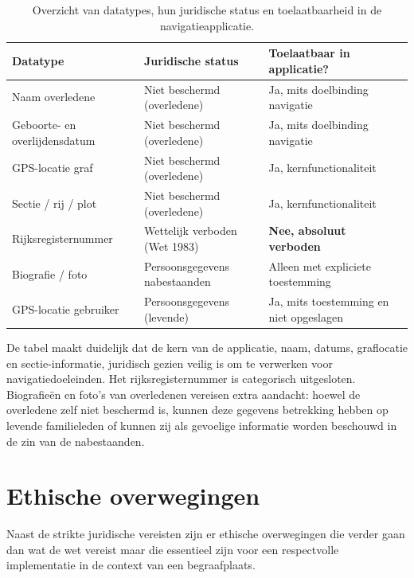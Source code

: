 \begin{table}[h]
    \centering
    \caption[Datatypes en juridische toelaatbaarheid]{Overzicht van datatypes, hun juridische status en toelaatbaarheid in de navigatieapplicatie.}
    \label{tab:datatypes}
    \renewcommand{\arraystretch}{1.4}
    \begin{tabular}{p{3.5cm} p{3cm} p{5cm}}
        \hline
        \textbf{Datatype} & \textbf{Juridische status} & \textbf{Toelaatbaar in applicatie?} \\
        \hline
        Naam overledene & Niet beschermd (overledene) & Ja, mits doelbinding navigatie \\
        \hline
        Geboorte- en overlijdensdatum & Niet beschermd (overledene) & Ja, mits doelbinding navigatie \\
        \hline
        GPS-locatie graf & Niet beschermd (overledene) & Ja, kernfunctionaliteit \\
        \hline
        Sectie / rij / plot & Niet beschermd (overledene) & Ja, kernfunctionaliteit \\
        \hline
        Rijksregisternummer & Wettelijk verboden (Wet 1983) & \textbf{Nee, absoluut verboden} \\
        \hline
        Biografie / foto & Persoonsgegevens nabestaanden & Alleen met expliciete toestemming \\
        \hline
        GPS-locatie gebruiker & Persoonsgegevens (levende) & Ja, mits toestemming en niet opgeslagen \\
        \hline
    \end{tabular}
\end{table}

De tabel maakt duidelijk dat de kern van de applicatie, naam, datums, graflocatie en sectie-informatie, juridisch gezien veilig is om te verwerken voor navigatiedoeleinden. Het rijksregisternummer is categorisch uitgesloten. Biografieën en foto's van overledenen vereisen extra aandacht: hoewel de overledene zelf niet beschermd is, kunnen deze gegevens betrekking hebben op levende familieleden of kunnen zij als gevoelige informatie worden beschouwd in de zin van de nabestaanden.

\section{Ethische overwegingen}

Naast de strikte juridische vereisten zijn er ethische overwegingen die verder gaan dan wat de wet vereist maar die essentieel zijn voor een respectvolle implementatie in de context van een begraafplaats.

